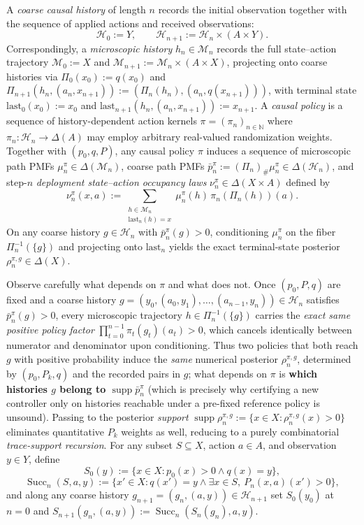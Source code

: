 \documentclass[11pt,a4paper]{article}
\begin{document}
A \emph{coarse causal history} of length \(n\) records the initial
observation together with the sequence of applied actions and received
observations:
\[\mathcal{H}_0 := Y, \qquad \mathcal{H}_{n+1} := \mathcal{H}_n \times (A \times Y).\]
Correspondingly, a \emph{microscopic history} \(h_n \in \mathcal{M}_n\)
records the full state--action trajectory \(\mathcal{M}_0 := X\) and
\(\mathcal{M}_{n+1} := \mathcal{M}_n \times (A \times X)\), projecting
onto coarse histories via \(\Pi_0(x_0) := q(x_0)\) and
\(\Pi_{n+1}(h_n, (a_n, x_{n+1})) := (\Pi_n(h_n), (a_n, q(x_{n+1})))\),
with terminal state \(\mathrm{last}_0(x_0) := x_0\) and
\(\mathrm{last}_{n+1}(h_n, (a_n, x_{n+1})) := x_{n+1}\). A \emph{causal
policy} is a sequence of history-dependent action kernels
\(\pi = (\pi_n)_{n \in \mathbb{N}}\) where
\(\pi_n: \mathcal{H}_n \to \Delta(A)\) may employ arbitrary real-valued
randomization weights. Together with \((p_0, q, P)\), any causal policy
\(\pi\) induces a sequence of microscopic path PMFs
\(\mu_n^\pi \in \Delta(\mathcal{M}_n)\), coarse path PMFs
\(\bar{p}_n^\pi := (\Pi_n)_\# \mu_n^\pi \in \Delta(\mathcal{H}_n)\), and
step-\(n\) \emph{deployment state--action occupancy laws}
\(\nu_n^\pi \in \Delta(X \times A)\) defined by
\[\nu_n^\pi(x, a) := \sum_{\substack{h \in \mathcal{M}_n \\ \mathrm{last}_n(h) = x}} \mu_n^\pi(h)\, \pi_n(\Pi_n(h))(a).\]
On any coarse history \(g \in \mathcal{H}_n\) with
\(\bar{p}_n^\pi(g) > 0\), conditioning \(\mu_n^\pi\) on the fiber
\(\Pi_n^{-1}(\{g\})\) and projecting onto \(\mathrm{last}_n\) yields the
exact terminal-state posterior \(\rho_n^{\pi, g} \in \Delta(X)\).

Observe carefully what depends on \(\pi\) and what does not. Once
\((p_0, P, q)\) are fixed and a coarse history
\(g = (y_0, (a_0, y_1), \dots, (a_{n-1}, y_n)) \in \mathcal{H}_n\)
satisfies \(\bar{p}_n^\pi(g) > 0\), every microscopic trajectory
\(h \in \Pi_n^{-1}(\{g\})\) carries the \emph{exact same positive policy
factor} \(\prod_{t=0}^{n-1} \pi_t(g_t)(a_t) > 0\), which cancels
identically between numerator and denominator upon conditioning. Thus
two policies that both reach \(g\) with positive probability induce the
\emph{same} numerical posterior \(\rho_n^{\pi, g}\), determined by
\((p_0, P_k, q)\) and the recorded pairs in \(g\); what depends on
\(\pi\) is \textbf{which histories \(g\) belong to
\(\operatorname{supp}\bar{p}_n^\pi\)} (which is precisely why certifying
a new controller only on histories reachable under a pre-fixed reference
policy is unsound). Passing to the posterior \emph{support}
\(\operatorname{supp}\rho_n^{\pi, g} := \{x \in X : \rho_n^{\pi, g}(x) > 0\}\)
eliminates quantitative \(P_k\) weights as well, reducing to a purely
combinatorial \emph{trace-support recursion}. For any subset
\(S \subseteq X\), action \(a \in A\), and observation \(y \in Y\),
define \[S_0(y) := \{x \in X : p_0(x) > 0 \land q(x) = y\},\]
\[\operatorname{Succ}_n(S, a, y) := \{x' \in X : q(x') = y \land \exists x \in S,\ P_n(x,a)(x') > 0\},\]
and along any coarse history
\(g_{n+1} = (g_n, (a, y)) \in \mathcal{H}_{n+1}\) set \(S_0(y_0)\) at
\(n=0\) and
\(S_{n+1}(g_n, (a, y)) := \operatorname{Succ}_n(S_n(g_n), a, y)\).
\end{document}
